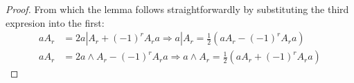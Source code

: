 \begin{proof}
	From which the lemma follows straightforwardly by substituting the third expresion into the first:
	\begin{align*}
		aA_r &= 2a | A_r + (-1)^rA_ra \Rightarrow a | A_r = \frac{1}{2} (aA_r - (-1)^rA_ra) \\
		aA_r &= 2a \wedge A_r - (-1)^rA_ra \Rightarrow a \wedge A_r = \frac{1}{2} (aA_r + (-1)^rA_ra)
	\end{align*}
\end{proof}
